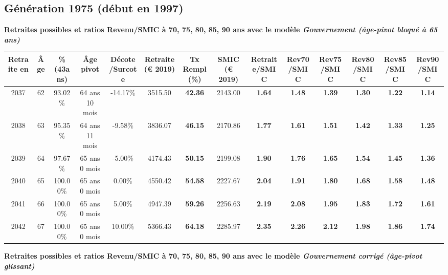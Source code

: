 \subsection{Génération 1975 (début en 1997)} 

{\bf \noindent Retraites possibles et ratios Revenu/SMIC à 70, 75, 80, 85, 90 ans avec le modèle \emph{Gouvernement (âge-pivot bloqué à 65 ans)}}  
 
\begin{adjustbox}{max width=\textwidth} 
\begin{tabular}[htb]{|c|c||c|c|c||c|c||c||c|c|c|c|c|c|} 
\hline 
 Retraite en &  Âge &  \%(43ans) &  Âge pivot &  Décote/Surcote &  Retraite (\euro{} 2019) &  Tx Rempl(\%) &  SMIC (\euro{} 2019) &  Retraite/SMIC &  Rev70/SMIC &  Rev75/SMIC &  Rev80/SMIC &  Rev85/SMIC &  Rev90/SMIC \\ 
\hline \hline 
 2037 &  62 &  93.02\% &  64 ans 10 mois &  -14.17\% &  3515.50 &  {\bf 42.36} &  2143.00 &  {\bf 1.64} &  {\bf 1.48} &  {\bf 1.39} &  {\bf 1.30} &  {\bf 1.22} &  {\bf 1.14} \\ 
\hline 
 2038 &  63 &  95.35\% &  64 ans 11 mois &  -9.58\% &  3836.07 &  {\bf 46.15} &  2170.86 &  {\bf 1.77} &  {\bf 1.61} &  {\bf 1.51} &  {\bf 1.42} &  {\bf 1.33} &  {\bf 1.25} \\ 
\hline 
 2039 &  64 &  97.67\% &  65 ans 0 mois &  -5.00\% &  4174.43 &  {\bf 50.15} &  2199.08 &  {\bf 1.90} &  {\bf 1.76} &  {\bf 1.65} &  {\bf 1.54} &  {\bf 1.45} &  {\bf 1.36} \\ 
\hline 
 2040 &  65 &  100.00\% &  65 ans 0 mois &  0.00\% &  4550.42 &  {\bf 54.58} &  2227.67 &  {\bf 2.04} &  {\bf 1.91} &  {\bf 1.80} &  {\bf 1.68} &  {\bf 1.58} &  {\bf 1.48} \\ 
\hline 
 2041 &  66 &  100.00\% &  65 ans 0 mois &  5.00\% &  4947.39 &  {\bf 59.26} &  2256.63 &  {\bf 2.19} &  {\bf 2.08} &  {\bf 1.95} &  {\bf 1.83} &  {\bf 1.72} &  {\bf 1.61} \\ 
\hline 
 2042 &  67 &  100.00\% &  65 ans 0 mois &  10.00\% &  5366.43 &  {\bf 64.18} &  2285.97 &  {\bf 2.35} &  {\bf 2.26} &  {\bf 2.12} &  {\bf 1.98} &  {\bf 1.86} &  {\bf 1.74} \\ 
\hline 
\hline 
\end{tabular} 
\end{adjustbox} 
 
 \vspace{0.1cm} 
{\bf \noindent Retraites possibles et ratios Revenu/SMIC à 70, 75, 80, 85, 90 ans avec le modèle \emph{Gouvernement corrigé (âge-pivot glissant)}}  
 
